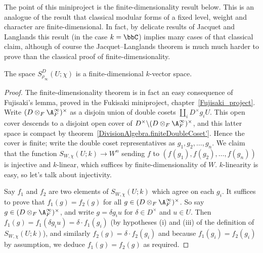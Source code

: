 The point of this miniproject is the finite-dimensionality result below.
This is an analogue of the result that classical modular forms of a fixed
level, weight and character are finite-dimensional. In fact, by delicate results
of Jacquet and Langlands this result (in the case $k=\bbC$) implies many cases of that classical claim,
although of course the Jacquet--Langlands theorem is much much harder to prove than the classical
proof of finite-dimensionality.


\begin{theorem}
  \label{TotallyDefiniteQuaternionAlgebra.AutomorphicForm.finiteDimensional}
  The space $S_{\rho_\infty}^D(U;\chi)$ is a finite-dimensional $k$-vector space.
\end{theorem}



\begin{proof}
  The finite-dimensionality theorem is in fact an easy consequence of Fujisaki's lemma,
  proved in the Fukisaki miniproject, chapter~\ref{Fujisaki_project}.
  Write $(D\otimes_F\A_F^\infty)^\times$ as a disjoin union of double cosets
  $\coprod_i D^\times g_i U$. This open cover descends to a disjoint open
  cover of $D^\times\backslash (D\otimes_F\A_F^\infty)^\times$,
  and this latter space is compact by theorem~\ref{DivisionAlgebra.finiteDoubleCoset'}.
  Hence the cover is finite; write the double coset representatives
  as $g_1,g_2,\ldots,g_n$. We claim that
  the function $S_{W,\chi}(U;k)\to W^n$ sending $f$ to $(f(g_1),f(g_2),\ldots,f(g_n))$
  is injective and $k$-linear, which suffices by finite-dimensionality of $W$.
  $k$-linearity is easy, so let's talk about injectivity.

  Say $f_1$ and $f_2$ are two elements of $S_{W,\chi}(U;k)$ which agree on
  each $g_i$. It suffices to prove that $f_1(g)=f_2(g)$ for all
  $g\in(D\otimes_F\A_F^\infty)^\times$. So say $g\in(D\otimes_F\A_F^\infty)^\times$,
  and write $g=\delta g_iu$ for $\delta \in D^\times$ and $u\in U$.
  Then $f_1(g)=f_1(\delta g_iu)=\delta\cdot f_1(g_i)$ (by hypotheses (i) and (iii)
  of the definition of $S_{W,\chi}(U;k)$), and similarly $f_2(g)=\delta\cdot f_2(g_i)$
  and because $f_1(g_i)=f_2(g_i)$ by assumption, we deduce $f_1(g)=f_2(g)$ as required.
\end{proof}

